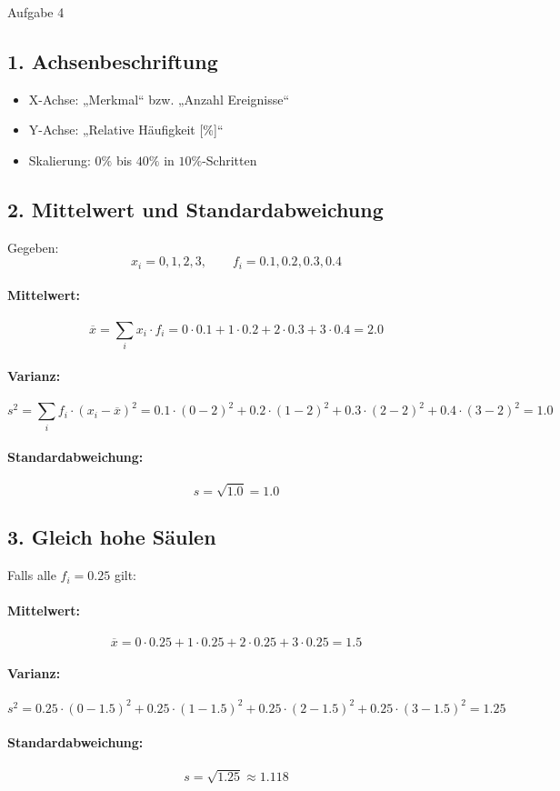 \documentclass[11pt,a4paper,oneside]{article}
\begin{document}
	\begin{loesung}{Aufgabe 4}
		\subsection*{1. Achsenbeschriftung}
		\begin{itemize}
			\item X-Achse: „Merkmal“ bzw. „Anzahl Ereignisse“
			\item Y-Achse: „Relative Häufigkeit [\%]“
			\item Skalierung: $0 \%$ bis $40 \%$ in $10 \%$-Schritten
		\end{itemize}
		
		\subsection*{2. Mittelwert und Standardabweichung}
		
		Gegeben:
		\[
		x_i = 0,1,2,3, \qquad f_i = 0.1,0.2,0.3,0.4
		\]
		
		\paragraph{Mittelwert:}
		\[
		\overline{x} = \sum_i x_i \cdot f_i 
		= 0\cdot 0.1 + 1\cdot 0.2 + 2\cdot 0.3 + 3\cdot 0.4
		= 2.0
		\]
		
		\paragraph{Varianz:}
		\[
		s^2 = \sum_i f_i \cdot (x_i - \overline{x})^2
		= 0.1\cdot (0-2)^2 + 0.2\cdot (1-2)^2 + 0.3\cdot (2-2)^2 + 0.4\cdot (3-2)^2
		= 1.0
		\]
		
		\paragraph{Standardabweichung:}
		\[
		s = \sqrt{1.0} = 1.0
		\]
		
		\subsection*{3. Gleich hohe Säulen}
		
		Falls alle $f_i = 0.25$ gilt:
		
		\paragraph{Mittelwert:}
		\[
		\overline{x} = 0\cdot0.25 + 1\cdot0.25 + 2\cdot0.25 + 3\cdot0.25 = 1.5
		\]
		
		\paragraph{Varianz:}
		\[
		s^2 = 0.25\cdot(0-1.5)^2 + 0.25\cdot(1-1.5)^2 
		+ 0.25\cdot(2-1.5)^2 + 0.25\cdot(3-1.5)^2 = 1.25
		\]
		
		\paragraph{Standardabweichung:}
		\[
		s = \sqrt{1.25} \approx 1.118
		\]
	\end{loesung}
	
\end{document}
